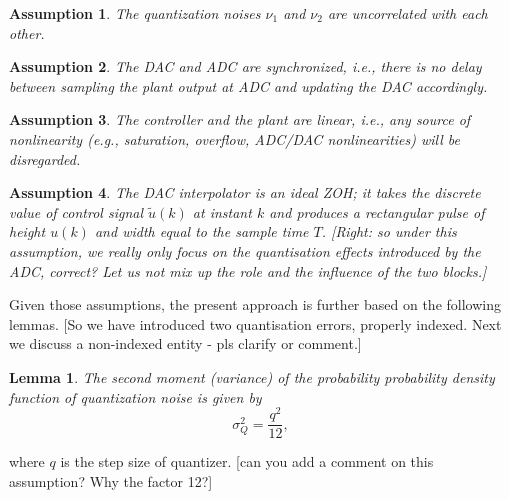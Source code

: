 \documentclass{sig-alternate-05-2015}
\newcommand{\blue}[1]{{\color{blue}#1}}
\newcommand{\red}[1]{{\color{red}#1}}
\newtheorem{myassumption}{Assumption}
\newtheorem{mylemma}{Lemma}
\begin{document}
\begin{myassumption}
The quantization noises $\nu_{1}$ and $\nu_{2}$ are uncorrelated with each other.
\end{myassumption}

\begin{myassumption}
%
The DAC and ADC are synchronized, {\it i.e.}, there is no delay between
sampling the plant output at ADC and updating the DAC accordingly.
%
\end{myassumption}

\begin{myassumption}
%
The controller and the plant are linear, {\it i.e.}, any source of nonlinearity ({\it e.g.}, saturation, overflow, ADC/DAC nonlinearities) will be disregarded.
%
\end{myassumption}

\begin{myassumption}
%
The DAC interpolator is an ideal ZOH; it takes the discrete value of control
signal $\tilde u(k)$ at instant $k$ and produces a rectangular pulse of height
$u(k)$ and width equal to the sample time $T$. \red{[Right: so under this assumption, we really only focus on the quantisation effects introduced by the ADC, correct? Let us not mix up the role and the influence of the two blocks.]}
%
\end{myassumption}

Given those assumptions, the present approach is further based on the following lemmas. 
\red{[So we have introduced two quantisation errors, properly indexed. Next we discuss a non-indexed entity - pls clarify or comment.]}
%
\begin{mylemma}
%
\cite{widrow1956} The second moment (variance) of the probability probability density function of quantization
noise is given by %
%
\begin{equation}
\label{eq:variancelemma}
\sigma_{Q}^{2}=\frac{q^{2}}{12},
\end{equation}
\end{mylemma}
where $q$ is the step size of quantizer. \blue{[can you add a comment on this assumption? Why the factor 12?]}
\end{document}
